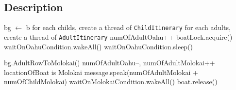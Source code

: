 \documentclass{article}
\begin{document}
\subsection{Description}

\begin{algorithm}
    \begin{algorithmic}
        \State bg $\leftarrow$ b
        \State for each childs, create a thread of \texttt{ChildItinerary}
        \State for each adults, create a thread of \texttt{AdultItinerary}
        \EndWhile
    \EndProcedure
        \State numOfAdultOahu++
        \State boatLock.acquire()
                \State waitOnOahuCondition.wakeAll()
            \EndIf
            \State waitOnOahuCondition.sleep()
        \EndWhile
        
        \State bg.AdultRowToMolokai()
        \State numOfAdultOahu--, numOfAdultMolokai++
        \State locationOfBoat is Molokai
        \State message.speak(numOfAdultMolokai + numOfChildMolokai)
        \State waitOnMolokaiCondition.wakeAll()
        \State boat.release()        
    \EndProcedure
    \end{algorithmic}
\end{algorithm}
\end{document}

